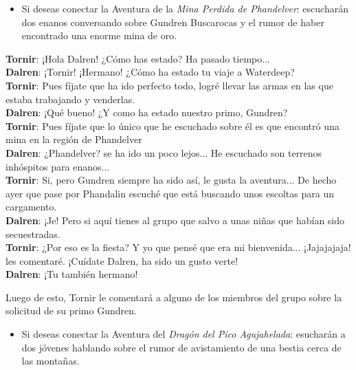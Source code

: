\documentclass[10pt,twoside,twocolumn,openany]{dndbook}
\begin{document}
\begin{itemize}
  \item Si deseas conectar la Aventura de la \emph{Mina Perdida de Phandelver}: escucharán dos 
  enanos conversando sobre Gundren Buscarocas y el rumor de haber encontrado una enorme mina de 
  oro.
\end{itemize}

\begin{DndReadAloud}
  \textbf{Tornir}: ¡Hola Dalren! ¿Cómo has estado? Ha pasado tiempo... \\
  \textbf{Dalren}: ¡Tornir! ¡Hermano! ¿Cómo ha estado tu viaje a Waterdeep? \\
  \textbf{Tornir}: Pues fíjate que ha ido perfecto todo, logré llevar las armas en las que estaba 
  trabajando y venderlas. \\
  \textbf{Dalren}: ¡Qué bueno! ¿Y como ha estado nuestro primo, Gundren? \\
  \textbf{Tornir}: Pues fíjate que lo único que he escuchado sobre él es que encontró una mina 
  en la región de Phandelver \\
  \textbf{Dalren}: ¿Phandelver? se ha ido un poco lejos... He escuchado son terrenos inhóspitos
  para enanos... \\
  \textbf{Tornir}: Si, pero Gundren siempre ha sido así, le gusta la aventura... De hecho ayer 
  que pase por Phandalin escuché que está buscando unos escoltas para un cargamento. \\
  \textbf{Dalren}: ¡Je! Pero si aquí tienes al grupo que salvo a unas niñas que habían sido 
  secuestradas. \\
  \textbf{Tornir}: ¿Por eso es la fiesta? Y yo que pensé que era mi bienvenida... ¡Jajajajaja! les 
  comentaré. ¡Cuídate Dalren, ha sido un gusto verte! \\
  \textbf{Dalren}: ¡Tu también hermano! \\
\end{DndReadAloud}

Luego de esto, Tornir le comentará a alguno de los miembros del grupo sobre la solicitud de 
su primo Gundren.

\begin{itemize}
  \item Si deseas conectar la Aventura del \emph{Dragón del Pico Agujahelada}: esucharán a dos 
  jóvenes hablando sobre el rumor de avistamiento de una bestia cerca de las montañas.
\end{itemize} 
\end{document}
